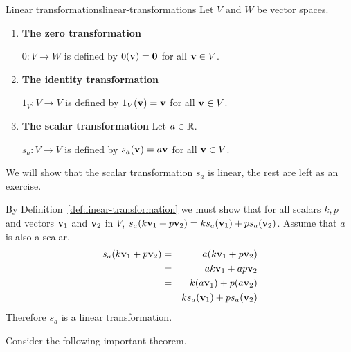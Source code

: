\begin{example}{Linear transformations}{linear-transformations}
  Let $V$ and $W$ be vector spaces.

  \begin{enumerate}
  \item \textbf{The zero transformation}

    $0:V\to W$ is defined by $0(\mbox{\bf v})=\mbox{\bf 0}$ for all
    $\mbox{\bf v}\in V$.

  \item \textbf{The identity transformation}

    $1_V:V\to V$ is defined by $1_V(\mbox{\bf v})=\mbox{\bf v}$ for all
    $\mbox{\bf v}\in V$.

  \item \textbf{The scalar transformation} Let $a\in\mathbb{R}$.

    $s_a:V\to V$ is defined by $s_a(\mbox{\bf v})=a\mbox{\bf v}$ for all
    $\mbox{\bf v}\in V$.
  \end{enumerate}
\end{example}

\begin{solution}
  We will show that the scalar transformation $s_a$ is linear, the
  rest are left as an exercise.

  By Definition~\ref{def:linear-transformation} we must show that for
  all scalars $k ,p $ and vectors $\mbox{\bf v}_1$ and $\mbox{\bf v}_2$ in
  $V$,
  $s_a(k \mbox{\bf v}_1 + p \mbox{\bf v}_2) = k s_a(\mbox{\bf v}_1)+ p
  s_a(\mbox{\bf v}_{2})$. Assume that $a$ is also a scalar.
  \begin{eqnarray*}
    s_a(k \mbox{\bf v}_1 + p \mbox{\bf v}_2)
    &=& a (k \mbox{\bf v}_1 + p \mbox{\bf v}_2) \\
    &=&  ak \mbox{\bf v}_1 + ap \mbox{\bf v}_2  \\
    &=&  k (a \mbox{\bf v}_1) + p(a \mbox{\bf v}_2)  \\
    &=& k s_a(\mbox{\bf v}_1)  + p s_a (\mbox{\bf v}_2)
  \end{eqnarray*}
  Therefore $s_a$ is a linear transformation.
\end{solution}

Consider the following important theorem.

